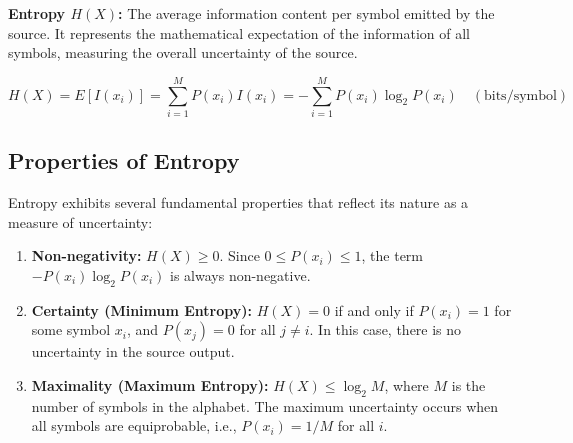\documentclass[12pt,a4paper]{article}
\begin{document}
\begin{tcolorbox}[defbox]
\textbf{Entropy $H(X)$:} The average information content per symbol emitted by the source. It represents the mathematical expectation of the information of all symbols, measuring the overall uncertainty of the source.
\end{tcolorbox}

\begin{tcolorbox}[formulabox, title={\textbf{Entropy Formula}}]
\begin{equation}
  H(X) = E[I(x_i)] = \sum_{i=1}^M P(x_i) I(x_i) = -\sum_{i=1}^M P(x_i) \log_2 P(x_i) \quad (\text{bits/symbol})
\end{equation}
\end{tcolorbox}

\subsection{Properties of Entropy}
Entropy exhibits several fundamental properties that reflect its nature as a measure of uncertainty:

\begin{enumerate}[label=\textbf{\arabic*.}, leftmargin=*, itemsep=4pt]
  \item \textbf{Non-negativity:} $H(X) \ge 0$. Since $0 \le P(x_i) \le 1$, the term $-P(x_i) \log_2 P(x_i)$ is always non-negative.
  \item \textbf{Certainty (Minimum Entropy):} $H(X) = 0$ if and only if $P(x_i) = 1$ for some symbol $x_i$, and $P(x_j) = 0$ for all $j \ne i$. In this case, there is no uncertainty in the source output.
  \item \textbf{Maximality (Maximum Entropy):} $H(X) \le \log_2 M$, where $M$ is the number of symbols in the alphabet. The maximum uncertainty occurs when all symbols are equiprobable, i.e., $P(x_i) = 1/M$ for all $i$.
\end{enumerate}
\end{document}
